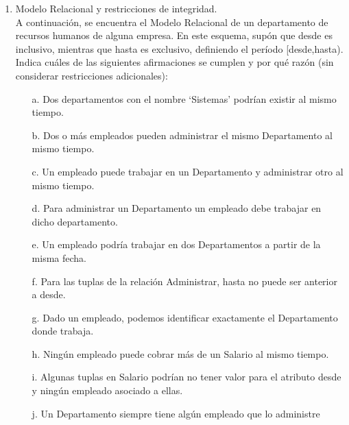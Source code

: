 \documentclass[12pt,a4paper]{article}
\begin{document}
\begin{enumerate}
	\item Modelo Relacional y restricciones de integridad.\\

		A continuación, se encuentra el Modelo Relacional de un departamento de recursos humanos de alguna empresa.
		En este esquema, supón que desde es inclusivo, mientras que hasta es exclusivo,
		definiendo el período [desde,hasta).
		Indica cuáles de las siguientes afirmaciones se cumplen y por qué razón
		(sin considerar restricciones adicionales):

		\begin{enumerate}
			\item[a.] Dos departamentos con el nombre ‘Sistemas’ podrían existir al mismo tiempo.\\
			\item[b.] Dos o más empleados pueden administrar el mismo Departamento al mismo tiempo.\\
			\item[c.] Un empleado puede trabajar en un Departamento y administrar otro al mismo tiempo.\\
			\item[d.] Para administrar un Departamento un empleado debe trabajar en dicho departamento.\\
			\item[e.] Un empleado podría trabajar en dos Departamentos a partir de la misma fecha.\\
			\item[f.] Para las tuplas de la relación Administrar, hasta no puede ser anterior a desde.\\
			\item[g.] Dado un empleado, podemos identificar exactamente el Departamento donde trabaja.\\
			\item[h.] Ningún empleado puede cobrar más de un Salario al mismo tiempo.\\
			\item[i.] Algunas tuplas en Salario podrían no tener valor para el atributo desde
				y ningún empleado asociado a ellas.\\
			\item[j.] Un Departamento siempre tiene algún empleado que lo administre\\
		\end{enumerate}

\end{enumerate}
\end{document}
